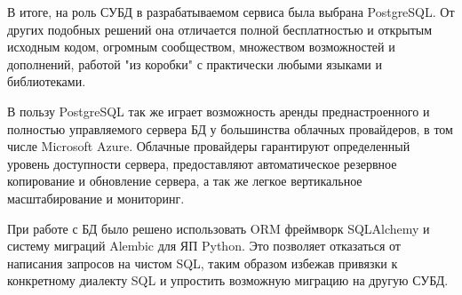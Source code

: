 В итоге, на роль СУБД в разрабатываемом сервиса была выбрана PostgreSQL. От других подобных решений она отличается полной бесплатностью и открытым исходным кодом, огромным сообществом, множеством возможностей и дополнений, работой "из коробки" с практически любыми языками и библиотеками.

В пользу PostgreSQL так же играет возможность аренды преднастроенного и полностью управляемого сервера БД у большинства облачных провайдеров, в том числе Microsoft Azure\cite{azure_postgresql}. Облачные провайдеры гарантируют определенный уровень доступности сервера, предоставляют автоматическое резервное копирование и обновление сервера, а так же легкое вертикальное масштабирование и мониторинг.

При работе с БД было решено использовать ORM \cite{keith2009object} фреймворк SQLAlchemy и систему миграций Alembic для ЯП Python. Это позволяет отказаться от написания запросов на чистом SQL, таким образом избежав привязки к конкретному диалекту SQL и упростить возможную миграцию на другую СУБД. 

